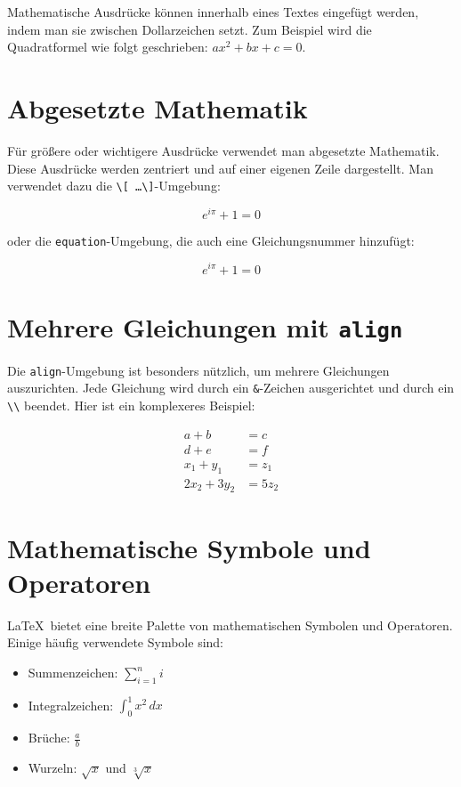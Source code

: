 Mathematische Ausdrücke können innerhalb eines Textes eingefügt werden, indem
man sie zwischen Dollarzeichen setzt. Zum Beispiel wird die Quadratformel wie
folgt geschrieben: \( ax^2 + bx + c = 0 \).

\section{Abgesetzte Mathematik}

Für größere oder wichtigere Ausdrücke verwendet man abgesetzte Mathematik. Diese
Ausdrücke werden zentriert und auf einer eigenen Zeile dargestellt. Man
verwendet dazu die \texttt{\textbackslash[ \dots \textbackslash]}-Umgebung:

\[
e^{i\pi} + 1 = 0
\]

oder die \texttt{equation}-Umgebung, die auch eine Gleichungsnummer hinzufügt:

\begin{equation}
e^{i\pi} + 1 = 0
\end{equation}

\section{Mehrere Gleichungen mit \texttt{align}}

Die \texttt{align}-Umgebung ist besonders nützlich, um mehrere Gleichungen
auszurichten. Jede Gleichung wird durch ein \texttt{\&}-Zeichen ausgerichtet und
durch ein \texttt{\textbackslash\textbackslash} beendet. Hier ist ein
komplexeres Beispiel:

\begin{align}
a + b &= c \\
d + e &= f \\
x_1 + y_1 &= z_1 \\
2x_2 + 3y_2 &= 5z_2
\end{align}

\section{Mathematische Symbole und Operatoren}

\LaTeX\ bietet eine breite Palette von mathematischen Symbolen und Operatoren.
Einige häufig verwendete Symbole sind:

\begin{itemize}
    \item Summenzeichen: \(\sum_{i=1}^n i\)
    \item Integralzeichen: \(\int_0^1 x^2 \, dx\)
    \item Brüche: \(\frac{a}{b}\)
    \item Wurzeln: \(\sqrt{x}\) und \(\sqrt[3]{x}\)
\end{itemize}

